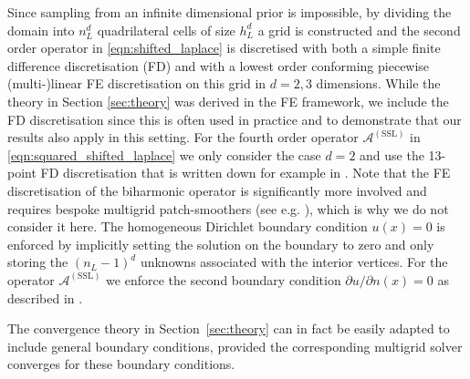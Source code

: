 \documentclass[11pt,english]{article}
\theoremstyle{plain}
\theoremstyle{plain}
\theoremstyle{plain}
\theoremstyle{plain}
\numberwithin{equation}{section}
\newcommand{\rev}[1]{#1}
\begin{document}
Since sampling from an infinite dimensional prior is impossible, by dividing the domain  into $n_L^d$ quadrilateral cells of size $h_L^d$ a grid is constructed and the second order operator in \eqref{eqn:shifted_laplace} is discretised with both a simple finite difference discretisation (FD) and with a lowest order conforming piecewise (multi-)linear FE discretisation on this grid in $d=2,3$ dimensions. \rev{While the theory in Section \ref{sec:theory} was derived in the FE framework, we include the FD discretisation since this is often used in practice and to demonstrate that our results also apply in this setting. For the fourth order operator $\mathcal{A}^{\mathrm{(SSL)}}$ in \eqref{eqn:squared_shifted_laplace} we only consider the case $d=2$ and use the 13-point FD discretisation that is written down for example in \cite{bjorstad1983fast}. Note that the FE discretisation of the biharmonic operator is significantly more involved and requires bespoke multigrid patch-smoothers (see e.g. \cite{witte2024tensor}), which is why we do not consider it here.} The homogeneous Dirichlet boundary condition $u(x)=0$ is enforced by implicitly setting the solution on the boundary to zero and only storing the $(n_L-1)^d$ unknowns associated with the interior vertices. For the operator $\mathcal{A}^{\mathrm{(SSL)}}$ we enforce the second boundary condition $\partial u/\partial n(x)=0$ as described in \cite{bjorstad1983fast}.

\rev{The convergence theory in Section~\ref{sec:theory} can in fact be easily adapted to include general boundary conditions, provided the corresponding multigrid solver converges for these boundary conditions.}
\end{document}
